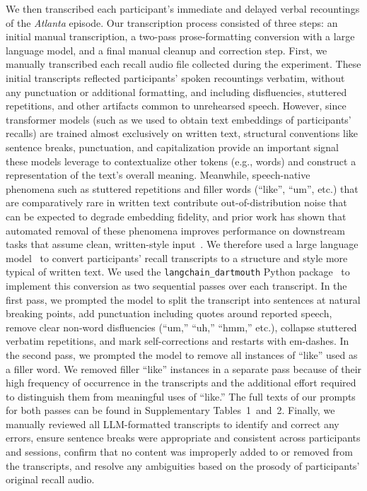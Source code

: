 \documentclass[10pt]{article}
\newcommand{\primaryPrompt}{1}
\newcommand{\likeRemovalPrompt}{2}
\begin{document}
We then transcribed each participant's immediate and delayed verbal recountings of the \textit{Atlanta} episode.
Our transcription process consisted of three steps: an initial manual transcription, a two-pass prose-formatting conversion with a large language model, and a final manual cleanup and correction step. 
First, we manually transcribed each recall audio file collected during the experiment.
These initial transcripts reflected participants' spoken recountings verbatim, without any punctuation or additional formatting, and including disfluencies, stuttered repetitions, and other artifacts common to unrehearsed speech.
However, since transformer models (such as we used to obtain text embeddings of participants' recalls) are trained almost exclusively on written text, structural conventions like sentence breaks, punctuation, and capitalization provide an important signal these models leverage to contextualize other tokens (e.g., words) and construct a representation of the text's overall meaning.
Meanwhile, speech-native phenomena such as stuttered repetitions and filler words (``like'', ``um'', etc.) that are comparatively rare in written text contribute out-of-distribution noise that can be expected to degrade embedding fidelity, and prior work has shown that automated removal of these phenomena improves performance on downstream tasks that assume clean, written-style input~\citep{ChenEtal22,WangEtal10b}.
We therefore used a large language model~\citep[Qwen3.5 122b;][]{Qwen26} to convert participants' recall transcripts to a structure and style more typical of written text.
We used the \texttt{langchain\_dartmouth} Python package~\citep{StonEtal25} to implement this conversion as two sequential passes over each transcript.
In the first pass, we prompted the model to split the transcript into sentences at natural breaking points, add punctuation including quotes around reported speech, remove clear non-word disfluencies (``um,'' ``uh,'' ``hmm,'' etc.), collapse stuttered verbatim repetitions, and mark self-corrections and restarts with em-dashes.
In the second pass, we prompted the model to remove all instances of ``like'' used as a filler word.
We removed filler ``like'' instances in a separate pass because of their high frequency of occurrence in the transcripts and the additional effort required to distinguish them from meaningful uses of ``like.''
The full texts of our prompts for both passes can be found in Supplementary Tables~\primaryPrompt~and~\likeRemovalPrompt.
Finally, we manually reviewed all LLM-formatted transcripts to identify and correct any errors, ensure sentence breaks were appropriate and consistent across participants and sessions, confirm that no content was improperly added to or removed from the transcripts, and resolve any ambiguities based on the prosody of participants' original recall audio.
\end{document}
